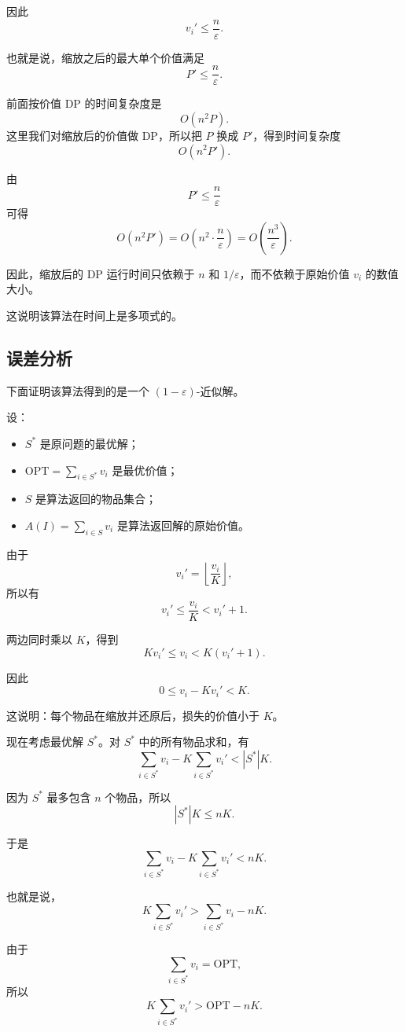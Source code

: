 \documentclass[UTF8,openany,12pt]{ctexbook}
\theoremstyle{remark}
\newcommand{\OPT}{\mathrm{OPT}}
\begin{document}
因此
\[
  v_i'\le \frac{n}{\varepsilon}.
\]

也就是说，缩放之后的最大单个价值满足
\[
  P'\le \frac{n}{\varepsilon}.
\]

前面按价值 DP 的时间复杂度是
\[
  O(n^2P).
\]
这里我们对缩放后的价值做 DP，所以把 $P$ 换成 $P'$，得到时间复杂度
\[
  O(n^2P').
\]

由
\[
  P'\le \frac{n}{\varepsilon}
\]
可得
\[
  O(n^2P')
  =
  O\left(n^2\cdot \frac{n}{\varepsilon}\right)
  =
  O\left(\frac{n^3}{\varepsilon}\right).
\]

因此，缩放后的 DP 运行时间只依赖于 $n$ 和 $1/\varepsilon$，而不依赖于原始价值
$v_i$ 的数值大小。

这说明该算法在时间上是多项式的。

\subsection{误差分析}

下面证明该算法得到的是一个 $(1-\varepsilon)$-近似解。

设：

\begin{itemize}
  \item $S^*$ 是原问题的最优解；
  \item $\OPT=\sum_{i\in S^*}v_i$ 是最优价值；
  \item $S$ 是算法返回的物品集合；
  \item $A(I)=\sum_{i\in S}v_i$ 是算法返回解的原始价值。
\end{itemize}

由于
\[
  v_i'
  =
  \left\lfloor \frac{v_i}{K}\right\rfloor,
\]
所以有
\[
  v_i'
  \le
  \frac{v_i}{K}
  <
  v_i'+1.
\]

两边同时乘以 $K$，得到
\[
  Kv_i'
  \le
  v_i
  <
  K(v_i'+1).
\]

因此
\[
  0\le v_i-Kv_i'<K.
\]

这说明：每个物品在缩放并还原后，损失的价值小于 $K$。

现在考虑最优解 $S^*$。对 $S^*$ 中的所有物品求和，有
\[
  \sum_{i\in S^*} v_i
  -
  K\sum_{i\in S^*}v_i'
  <
  |S^*|K.
\]

因为 $S^*$ 最多包含 $n$ 个物品，所以
\[
  |S^*|K\le nK.
\]

于是
\[
  \sum_{i\in S^*} v_i
  -
  K\sum_{i\in S^*}v_i'
  <
  nK.
\]

也就是说，
\[
  K\sum_{i\in S^*}v_i'
  >
  \sum_{i\in S^*} v_i-nK.
\]

由于
\[
  \sum_{i\in S^*} v_i=\OPT,
\]
所以
\[
  K\sum_{i\in S^*}v_i'
  >
  \OPT-nK.
\]
\end{document}
